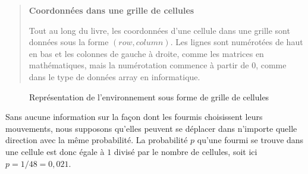 \begin{quote}
\begin{center}
\textbf{Coordonnées dans une grille de cellules}
\end{center}
Tout au long du livre, les coordonnées d'une cellule dans une grille sont données sous la forme $(\textit{row}, \textit{column})$. Les lignes sont numérotées de haut en bas et les colonnes de gauche à droite, comme les matrices en mathématiques, mais la numérotation commence à partir de $0$, comme dans le type de données array en informatique.
\end{quote}

\begin{figure}
\begin{center}
\end{center}
\caption{Représentation de l'environnement sous forme de grille de cellules}\label{fig.ant-grid-empty}
\end{figure}
Sans aucune information sur la façon dont les fourmis choisissent leurs mouvements, nous supposons qu'elles peuvent se déplacer dans n'importe quelle direction avec la même probabilité. La probabilité $p$ qu'une fourmi se trouve dans une cellule est donc égale à $1$ divisé par le nombre de cellules, soit ici $p=1/48=0,021$.

